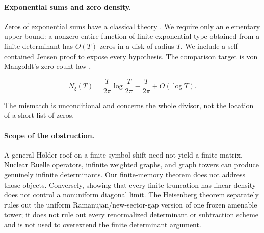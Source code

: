 \paragraph{Exponential sums and zero density.}
Zeros of exponential sums have a classical theory
\citep{langer1931zeros,heittokangas2021polya}. We require only an elementary
upper bound: a nonzero entire function of finite exponential type obtained
from a finite determinant has \(O(T)\) zeros in a disk of radius \(T\). We
include a self-contained Jensen proof to expose every hypothesis. The
comparison target is von Mangoldt's zero-count law
\citep{vonmangoldt1905zeros},

\[
N_\xi(T)=
\frac{T}{2\pi}\log\frac{T}{2\pi}
-\frac{T}{2\pi}+O(\log T).
\]

The mismatch is unconditional and concerns the whole divisor, not the
location of a short list of zeros.

\paragraph{Scope of the obstruction.}
A general H{\"o}lder roof on a finite-symbol shift need not yield a finite
matrix. Nuclear Ruelle operators, infinite weighted graphs, and graph towers
can produce genuinely infinite determinants. Our finite-memory theorem does
not address those objects. Conversely, showing that every finite truncation
has linear density does not control a nonuniform diagonal limit. The
Heisenberg theorem separately rules out the uniform
Ramanujan/new-sector-gap version of one frozen amenable tower; it does not
rule out every renormalized determinant or subtraction scheme and is not
used to overextend the finite determinant argument.
